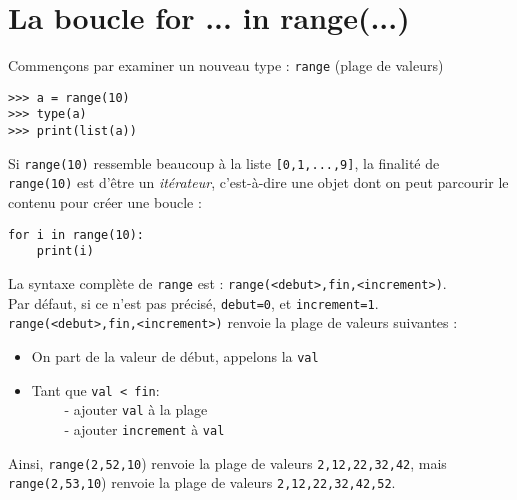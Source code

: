 \section{La boucle for ... in range(...)}

Commençons par examiner un nouveau type : \texttt{range} (plage de valeurs)

\begin{pys}
\begin{verbatim}
>>> a = range(10)
>>> type(a)
>>> print(list(a))
\end{verbatim}
\end{pys}

Si \texttt{range(10)} ressemble beaucoup à la liste \texttt{[0,1,...,9]}, la finalité de \\\texttt{range(10)} est d'être un \textit{itérateur}, 
c'est-à-dire une objet dont on peut parcourir le contenu pour créer une boucle :

\begin{pyc}
\begin{verbatim}
for i in range(10):
    print(i)
\end{verbatim}
\end{pyc}
La syntaxe complète de \texttt{range} est : \texttt{range(<debut>,fin,<increment>)}.\\

Par défaut, si ce n'est pas précisé, \texttt{debut=0}, et \texttt{increment=1}.\\

\texttt{range(<debut>,fin,<increment>)} renvoie la plage de valeurs suivantes :
\begin{itemize}
    \item   On part de la valeur de début, appelons la \texttt{val}
    \item   Tant que \texttt{val < fin}:\\
    $\qquad$ - ajouter \texttt{val} à la plage\\
    $\qquad$ - ajouter \texttt{increment} à \texttt{val}
\end{itemize}
Ainsi, \texttt{range(2,52,10}) renvoie la plage de valeurs \texttt{2,12,22,32,42}, mais\\ \texttt{range(2,53,10}) renvoie la plage de valeurs 
\texttt{2,12,22,32,42,52}.\\

